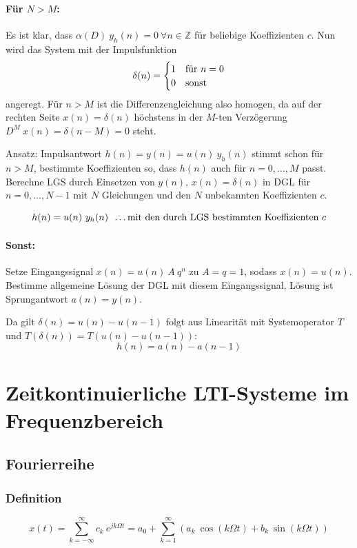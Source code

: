 \documentclass[10pt,a4paper]{article}
\newcommand{\fancythumb}[2]{
	\addthumb{#1}{\large\sffamily\textbf{\space\space#1\vspace{5pt}}}{white}{#2}
}
\begin{document}
\paragraph{Für $N > M$:} Es ist klar, dass $\alpha(D) ~ y_h(n) = 0 ~ \forall n \in \mathbb Z$ für beliebige Koeffizienten $c$. Nun wird das System mit der Impulsfunktion 
\[
	\delta(n) =
	\begin{cases}
		1 & \textnormal{für } n = 0 \\
		0 & \textnormal{sonst}
	\end{cases}
\]
angeregt. Für $n > M$ ist die Differenzengleichung also homogen, da auf der rechten Seite $x(n) = \delta(n)$ höchstens in der $M$-ten Verzögerung $D^M ~ x(n) = \delta(n - M) = 0$ steht.

\vspace{.5em}
Ansatz: Impulsantwort $h(n) = y(n) = u(n) ~ y_h(n)$ stimmt schon für $n > M$, bestimmte Koeffizienten so, dass $h(n)$ auch für $n = 0, …, M$ passt. Berechne LGS durch Einsetzen von $y(n)$, $x(n) = \delta(n)$ in DGL für $n = 0, …, N - 1$ mit $N$ Gleichungen und den $N$ unbekannten Koeffizienten $c$.

\[
	h(n) = u(n) ~ y_h(n) ~~ \textnormal{…mit den durch LGS bestimmten Koeffizienten $c$}
\]

\paragraph{Sonst:} Setze Eingangssignal $x(n) = u(n) ~ A ~ q^n$ zu $A = q = 1$, sodass $x(n) = u(n)$. Bestimme allgemeine Lösung der DGL mit diesem Eingangssignal, Lösung ist Sprungantwort $a(n) = y(n)$.

\vspace{.5em}
Da gilt $\delta(n) = u(n) - u(n - 1)$ folgt aus Linearität mit Systemoperator $T$ und $T(\delta(n)) = T(u(n) - u(n - 1))$:
\[
	h(n) = a(n) - a(n-1)
\]

\newpage


\section*{Zeitkontinuierliche LTI-Systeme im Frequenzbereich}
\fancythumb{ZK-f}{blue}
\subsection*{Fourierreihe}
\subsubsection*{Definition}
\[
	x(t) = \sum_{k=-\infty}^\infty c_k ~ e^{jk\Omega t} = a_0 + \sum_{k=1}^\infty \left( a_k ~ \cos(k \Omega t) + b_k ~ \sin(k \Omega t) \right)
\]
\end{document}
